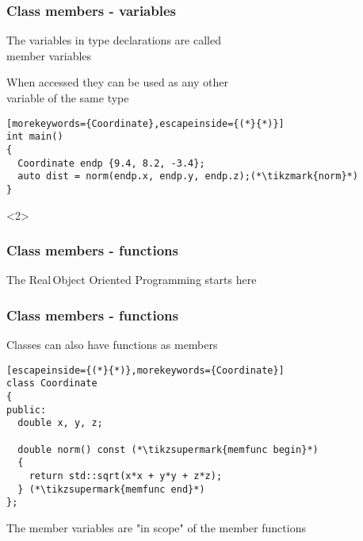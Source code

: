 \documentclass[14pt,a4paper,dvipsnames,usenames]{beamer}
\begin{document}
\begin{frame}[fragile]
  \frametitle{Class members - variables}

  The variables in type declarations are called\\member variables

  \vspace{.5em}
  When accessed they can be used as any other\\variable of the same type

  \vspace{.5em}
  \begin{lstlisting}[morekeywords={Coordinate},escapeinside={(*}{*)}]
int main()
{
  Coordinate endp {9.4, 8.2, -3.4};
  auto dist = norm(endp.x, endp.y, endp.z);(*\tikzmark{norm}*)
}
  \end{lstlisting}

  
  \begin{onlyenv}<2>
  \nointerlineskip
  \end{onlyenv}
  
\end{frame}

\begin{frame}[fragile]
  \frametitle{Class members - functions}
  
  The Real\texttrademark \,Object Oriented Programming starts here

\end{frame}

\begin{frame}[fragile]
  \frametitle{Class members - functions}

  Classes can also have functions as members

  
  \vspace{.5em}
  \begin{lstlisting}[escapeinside={(*}{*)},morekeywords={Coordinate}]
class Coordinate
{
public:
  double x, y, z;

  double norm() const (*\tikzsupermark{memfunc begin}*)
  {
    return std::sqrt(x*x + y*y + z*z);
  } (*\tikzsupermark{memfunc end}*)
};
  \end{lstlisting}

  \vspace{.5em}
  {\fontsize{12pt}{12pt}\selectfont The member variables are "in scope" of the member functions}

\end{frame}
\end{document}
